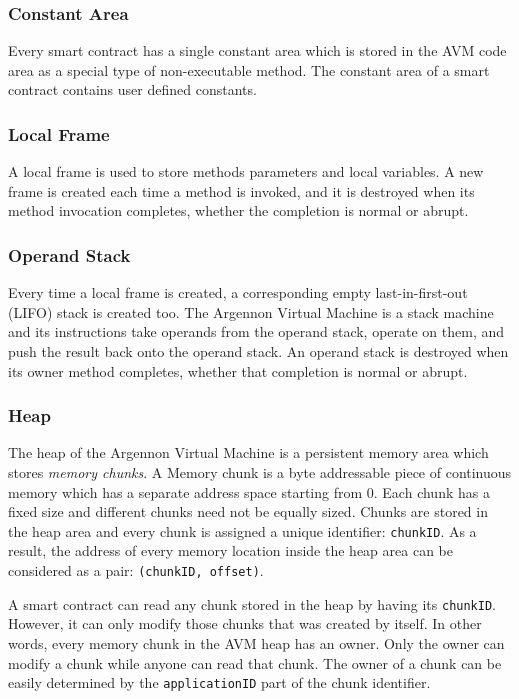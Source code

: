 \subsubsection{Constant Area}

Every smart contract has a single constant area which is stored in the AVM code area as a special type of
non-executable method. The constant area of a smart contract contains user
defined constants.



\subsubsection{Local Frame}

A local frame is used to store methods parameters and local variables. A new frame is created each time a method
is invoked, and it is destroyed when its method invocation completes, whether the completion is normal or abrupt.

\subsubsection{Operand Stack}

Every time a local frame is created, a corresponding empty last-in-first-out (LIFO) stack is created too. The
Argennon Virtual Machine is a stack machine and its instructions take operands from the operand stack, operate on
them, and push the result back onto the operand stack. An operand stack is destroyed when its owner method
completes, whether that completion is normal or abrupt.

\subsubsection{Heap}

The heap of the Argennon Virtual Machine is a persistent memory area which stores \emph{memory chunks}. A Memory
chunk is a byte addressable piece of continuous memory which has a separate address space starting from 0. Each chunk
has a fixed size and different chunks need not be equally sized. Chunks are stored in the heap area and every chunk is
assigned a unique identifier: \texttt{chunkID}. As a result, the address of every memory location inside
the heap area can be considered as a pair: \texttt{(chunkID, offset)}.

A smart contract can read any chunk stored in the heap by having its \texttt{chunkID}. However, it can only modify
those chunks that was created by itself. In other words, every memory chunk in the AVM heap has an owner. Only
the owner can modify a chunk while anyone can read that chunk. The owner of a chunk can be easily determined
by the \texttt{applicationID} part of the chunk identifier.

